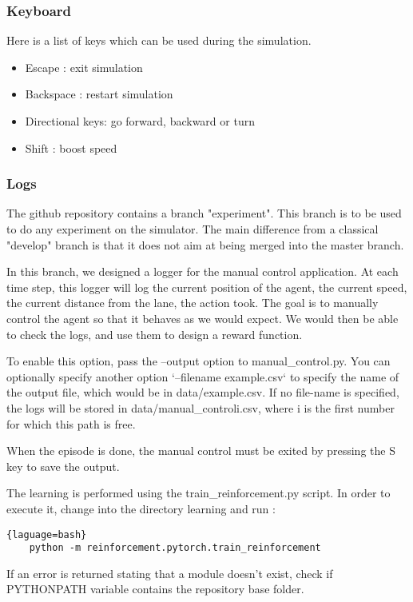 \documentclass[12pt]{article}
\begin{document}
\subsubsection{Keyboard}
Here is a list of keys which can be used during the simulation.

\begin{itemize}
	\item Escape : exit simulation
	\item Backspace : restart simulation
	\item Directional keys: go forward, backward or turn
	\item Shift : boost speed
\end{itemize}

\subsubsection{Logs}
The github repository contains a branch "experiment". This branch is to be used to do any experiment on the simulator. The main difference from a classical "develop" branch is that it does not aim at being merged into the master branch. 

In this branch, we designed a logger for the manual control application. At each time step, this logger will log the current position of the agent, the current speed, the current distance from the lane, the action took. The goal is to manually control the agent so that it behaves as we would expect. We would then be able to check the logs, and use them to design a reward function.

To enable this option, pass the --output option to manual\_control.py. You can optionally specify another option `--filename example.csv` to specify the name of the output file, which would be in data/example.csv. If no file-name is specified, the logs will be stored in data/manual\_controli.csv, where i is the first number for which this path is free.

When the episode is done, the manual control must be exited by pressing the S key to save the output.

The learning is performed using the train\_reinforcement.py script. In order to execute it, change into the directory learning and run : 

\begin{lstlisting}{laguage=bash}
    python -m reinforcement.pytorch.train_reinforcement
\end{lstlisting}

If an error is returned stating that a module doesn't exist, check if PYTHONPATH variable contains the repository base folder.
\end{document}

